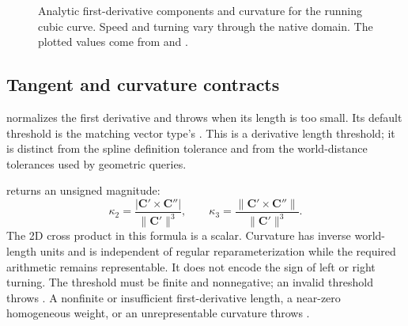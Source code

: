 \begin{figure}[tbp]
\centering
{}\hfill
{}
\caption{Analytic first-derivative components and curvature for the running
cubic curve. Speed and turning vary through the native domain. The plotted
values come from  and .}
\label{fig:spline-differential}
\end{figure}

\subsection{Tangent and curvature contracts}

 normalizes the first derivative and throws
 when its length is too small. Its default threshold
is the matching vector type's . This is a derivative
length threshold; it is distinct from the spline definition tolerance and
from the world-distance tolerances used by geometric queries.

 returns an unsigned magnitude:
\begin{equation}
 \kappa_2=\frac{|\mathbf C'\mathbin{\times}\mathbf C''|}
                  {\|\mathbf C'\|^3},\qquad
 \kappa_3=\frac{\|\mathbf C'\mathbin{\times}\mathbf C''\|}
                  {\|\mathbf C'\|^3}.
\end{equation}
The 2D cross product in this formula is a scalar. Curvature has inverse
world-length units and is independent of regular reparameterization while
the required arithmetic remains representable. It does not encode the sign
of left or right turning. The threshold must be finite and nonnegative;
an invalid threshold throws . A nonfinite or
insufficient first-derivative length, a near-zero homogeneous weight, or an
unrepresentable curvature throws .

